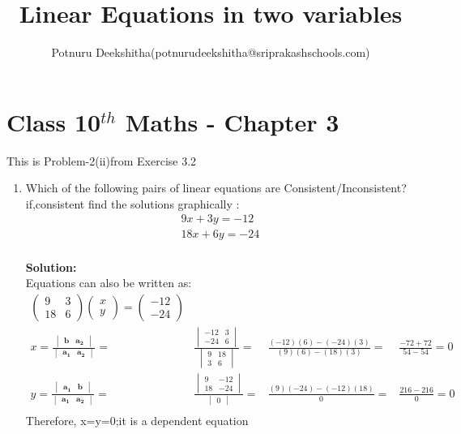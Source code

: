 \documentclass[12pt]{article}
\title{Linear Equations in two variables }
\author{Potnuru Deekshitha(potnurudeekshitha@sriprakashschools.com)}
\newcommand{\myvec}[1]{\ensuremath{\begin{pmatrix}#1\end{pmatrix}}}
\newcommand{\mydet}[1]{\ensuremath{\begin{vmatrix}#1\end{vmatrix}}}
\newcommand{\solution}{\noindent \textbf{Solution: }}
\let\vec\mathbf
\begin{document}
\maketitle
\section*{Class 10$^{th}$ Maths - Chapter 3}
This is Problem-2(ii)from Exercise 3.2
\begin{enumerate}
\item Which of the following pairs of linear equations are Consistent/Inconsistent?if,consistent find the solutions graphically :\\
\begin{align}
    9x+3y=-12\\
         18x+6y=-24 \\ 
\end{align}
      
\solution \\
            Equations  can also be written as:\\     
\begin{align}
\myvec{9&3\\18&6}\myvec{x\\y} = \myvec{-12\\-24}\\
x=\frac{\mydet{ \vec{b} & \vec{a_2}}}{\mydet{ \vec{a_1} &\vec{a_2} }} =&
\frac{\mydet{ -12 & 3 \\ -24 & 6 }}{\mydet{9&18\\3&6}} =&
\frac{(-12)(6)-(-24)(3)}{(9)(6)-(18)(3)} =&
\frac{-72+72}{54-54} = 0 \\
y=\frac{\mydet{\vec{a_1}&\vec{b}}}{\mydet{\vec{a_1}&\vec{a_2}}} =&
\frac{\mydet{9&-12\\18&-24}}{\mydet{0}} =&
\frac{(9)(-24)-(-12)(18)}{0} =&
\frac{216-216}{0} = 0\\
\end{align}
Therefore, x=y=0;it is a dependent equation

	

\end{enumerate}
\end{document}
